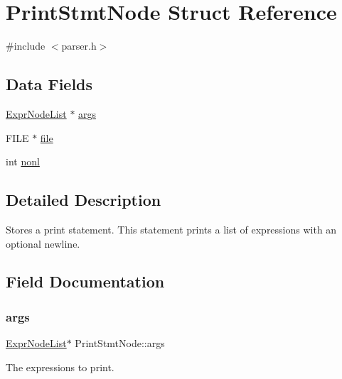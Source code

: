\hypertarget{struct_print_stmt_node}{}\section{Print\+Stmt\+Node Struct Reference}
\label{struct_print_stmt_node}


{\ttfamily \#include $<$parser.\+h$>$}

\subsection*{Data Fields}
\begin{DoxyCompactItemize}
\item 
\hyperlink{struct_expr_node_list}{Expr\+Node\+List} $\ast$ \hyperlink{struct_print_stmt_node_a9ee87b79d331dc05b6a4bb27462a5f69}{args}
\item 
F\+I\+LE $\ast$ \hyperlink{struct_print_stmt_node_a258c6f732a1c196ba01cd3f87ac4d6ac}{file}
\item 
int \hyperlink{struct_print_stmt_node_a147ba34eeda7bcfb39f2846a678d091c}{nonl}
\end{DoxyCompactItemize}


\subsection{Detailed Description}
Stores a print statement. This statement prints a list of expressions with an optional newline. 

\subsection{Field Documentation}
\mbox{\label{struct_print_stmt_node_a9ee87b79d331dc05b6a4bb27462a5f69}} 
\subsubsection{\texorpdfstring{args}{args}}
{\footnotesize\ttfamily \hyperlink{struct_expr_node_list}{Expr\+Node\+List}$\ast$ Print\+Stmt\+Node\+::args}

The expressions to print. \mbox{\label{struct_print_stmt_node_a258c6f732a1c196ba01cd3f87ac4d6ac}} 
